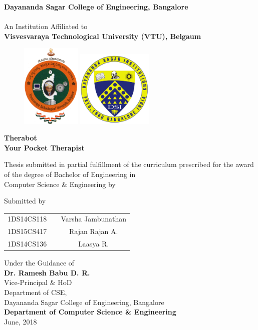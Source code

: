\begin{titlingpage}

\thispagestyle{empty}
\centering

\setlength{\toptafiddle}{1in}
\setlength{\bottafiddle}{1in}

\vspace*{-0.75in}
\enlargethispage{\toptafiddle}

\textbf{Dayananda Sagar College of Engineering, Bangalore}\\
\hspace{0.1cm}\\
An Institution Affiliated to\\
\textbf{Visvesvaraya Technological University (VTU), Belgaum}\\
\vspace{0.2cm}

\begin{figure}[h]
    \centering
    \includegraphics[height=4cm]{images/vtu.png}
    \hspace{0.1\textwidth}
    \includegraphics[height=3.7cm]{images/dsi.png}
\end{figure}

\vfill
\Huge{\textbf{\textcolor{therablue}{Therabot}}}\\
\Large{\textbf{Your Pocket Therapist}}
\vfill

\large Thesis submitted in partial fulfillment of the curriculum
prescribed for the award of the degree of Bachelor of Engineering
in \\Computer Science \& Engineering by\vfill

Submitted by\\
\begin{tabular}{ccc}
1DS14CS118 &  & Varsha Jambunathan\\
1DS15CS417 &  & Rajan Rajan A.\\
1DS14CS136 &  & Laasya R.\\
\end{tabular}
\vfill

Under the Guidance of\\
\Large{\textbf{Dr. Ramesh Babu D. R.}}\\
Vice-Principal \& HoD\\
Department of CSE,\\
Dayananda Sagar College of Engineering, Bangalore\\
\vfill
\textbf{Department of Computer Science \& Engineering}\\
June, 2018
\end{titlingpage}
